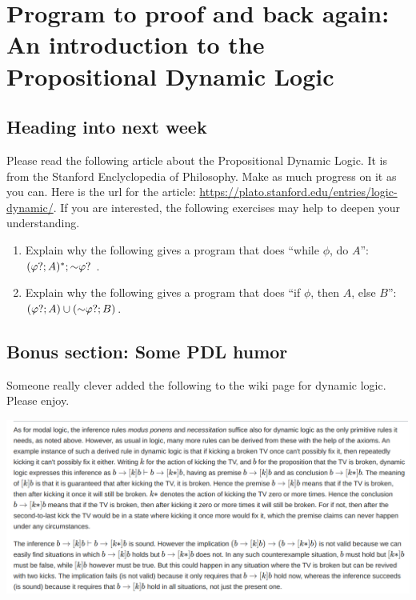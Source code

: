 \chapter[Week of Propositional Dynamic Logic]{Program to proof and back again: An introduction to the Propositional Dynamic Logic}

\setcounter{section}{-1}

\section{Heading into next week}

Please read the following article about the Propositional Dynamic Logic. It is from the Stanford Enclyclopedia of Philosophy.
Make as much progress on it as you can. Here is the url for the article: \url{https://plato.stanford.edu/entries/logic-dynamic/}.
If you are interested, the following exercises may help to deepen your understanding.

\begin{enumerate}
    \item Explain why the following gives a program that does ``while $\phi$, do $A$'':  $(\varphi ? ; A)^* ; \mathord{\sim} \varphi ?$ .
    \item Explain why the following gives a program that does ``if $\phi$, then $A$, else $B$'': $(\varphi ? ; A) \cup (\mathord{\sim} \varphi ? ; B)$.
\end{enumerate}

\section{Bonus section: Some PDL humor}

Someone really clever added the following to the wiki page for dynamic logic. Please enjoy.

\begin{center}
    \includegraphics[width=\textwidth]{image (1).png}
\end{center}